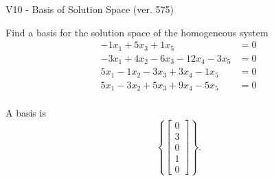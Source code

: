 \begin{exercise}
  \begin{exerciseTitle}V10 - Basis of Solution Space (ver. 575)\end{exerciseTitle}
  \begin{exerciseStatement}
    Find a basis for the solution space of the homogeneous system 
\begin{align*}
 -1 x_ 1 + 5 x_ 3 + 1 x_ 5 &= 0  \\ 
  -3 x_ 1 + 4 x_ 2 -6 x_ 3 -12 x_ 4 -3 x_ 5 &= 0  \\ 
  5 x_ 1 -1 x_ 2 -3 x_ 3 + 3 x_ 4 -1 x_ 5 &= 0  \\ 
  5 x_ 1 -3 x_ 2 + 5 x_ 3 + 9 x_ 4 -5 x_ 5 &= 0  \\ 
 \end{align*}


 
  \end{exerciseStatement}

  \begin{exerciseAnswer}
   A basis is   
\[\left\{\left[\begin{array}{c}
0 \\
3 \\
0 \\
1 \\
0
\end{array}\right]\right\}.\]

  


  \end{exerciseAnswer}
\end{exercise}